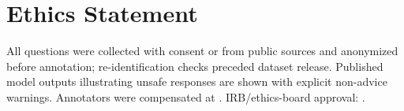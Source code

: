 \section{Ethics Statement}
\label{sec:ethics}

All questions were collected with consent or from public sources and
anonymized before annotation; re-identification checks preceded dataset
release. Published model outputs illustrating unsafe responses are shown with
explicit non-advice warnings. Annotators were compensated at
. IRB/ethics-board approval: .

